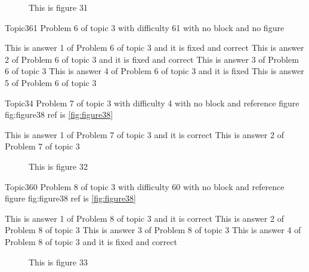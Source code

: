 \documentclass[master]{exam}
\begin{document}
\begin{figure}
	\begin{center}
		This is figure 31 
		\label{fig:figure31}
	\end{center}
\end{figure}

\begin{problem}{Topic3}{61}
	Problem 6 of topic 3 with difficulty 61 with no block and no figure
	\begin{answers}
		 This is answer 1 of Problem 6 of topic 3 and it is fixed and correct
		 This is answer 2 of Problem 6 of topic 3 and it is fixed and correct
		\answer This is answer 3 of Problem 6 of topic 3 
		\answer[fixed] This is answer 4 of Problem 6 of topic 3 and it is fixed
		\answer This is answer 5 of Problem 6 of topic 3 
	\end{answers}
\end{problem}

\begin{problem}{Topic3}{4}
	Problem 7 of topic 3 with difficulty 4 with no block and reference figure fig:figure38 ref is \ref{fig:figure38}
	\begin{answers}
		\answer[correct] This is answer 1 of Problem 7 of topic 3 and it is correct
		\answer This is answer 2 of Problem 7 of topic 3 
	\end{answers}
\end{problem}



\begin{figure}
	\begin{center}
		This is figure 32 
		\label{fig:figure32}
	\end{center}
\end{figure}

\begin{problem}{Topic3}{60}
	Problem 8 of topic 3 with difficulty 60 with no block and reference figure fig:figure38 ref is \ref{fig:figure38}
	\begin{answers}
		\answer[correct] This is answer 1 of Problem 8 of topic 3 and it is correct
		\answer This is answer 2 of Problem 8 of topic 3 
		\answer This is answer 3 of Problem 8 of topic 3 
		 This is answer 4 of Problem 8 of topic 3 and it is fixed and correct
	\end{answers}
\end{problem}



\begin{figure}
	\begin{center}
		This is figure 33 
		\label{fig:figure33}
	\end{center}
\end{figure}
\end{document}
